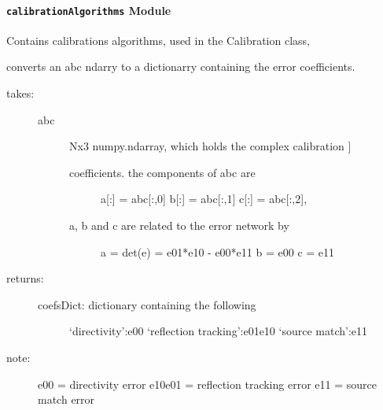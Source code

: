 \documentclass[letterpaper,10pt,english]{sphinxmanual}
\begin{document}
\paragraph{\texttt{calibrationAlgorithms} Module}
\label{api/mwavepy.calibration:module-mwavepy.calibration.calibrationAlgorithms}\label{api/mwavepy.calibration:calibrationalgorithms-module}
Contains calibrations algorithms, used in the Calibration class,

\begin{fulllineitems}
\label{api/mwavepy.calibration:mwavepy.calibration.calibrationAlgorithms.abc_2_coefs_dict}
converts an abc ndarry to a dictionarry containing the error 
coefficients.
\begin{description}
\item[{takes: }] \leavevmode\begin{description}
\item[{abc}] \leavevmode{[}Nx3 numpy.ndarray, which holds the complex calibration {]}\begin{description}
\item[{coefficients. the components of abc are }] \leavevmode
a{[}:{]} = abc{[}:,0{]}
b{[}:{]} = abc{[}:,1{]}
c{[}:{]} = abc{[}:,2{]},

\item[{a, b and c are related to the error network by }] \leavevmode
a = det(e) = e01*e10 - e00*e11 
b = e00 
c = e11

\end{description}

\end{description}

\item[{returns:}] \leavevmode\begin{description}
\item[{coefsDict: dictionary containing the following}] \leavevmode
`directivity':e00
`reflection tracking':e01e10
`source match':e11

\end{description}

\item[{note: }] \leavevmode
e00 = directivity error
e10e01 = reflection tracking error
e11 = source match error

\end{description}

\end{fulllineitems}
\end{document}

